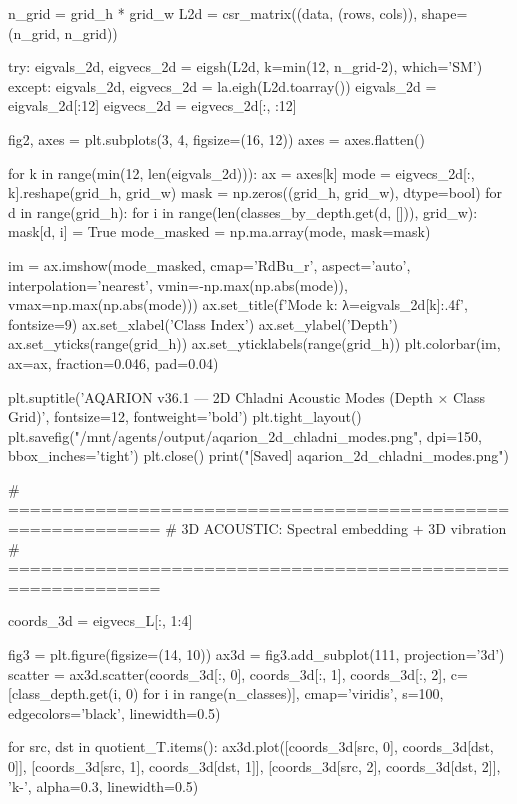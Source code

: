 {{{{{{{{{{{{{n_grid = grid_h * grid_w
L2d = csr_matrix((data, (rows, cols)), shape=(n_grid, n_grid))

try:
    eigvals_2d, eigvecs_2d = eigsh(L2d, k=min(12, n_grid-2), which='SM')
except:
    eigvals_2d, eigvecs_2d = la.eigh(L2d.toarray())
    eigvals_2d = eigvals_2d[:12]
    eigvecs_2d = eigvecs_2d[:, :12]

fig2, axes = plt.subplots(3, 4, figsize=(16, 12))
axes = axes.flatten()

for k in range(min(12, len(eigvals_2d))):
    ax = axes[k]
    mode = eigvecs_2d[:, k].reshape(grid_h, grid_w)
    mask = np.zeros((grid_h, grid_w), dtype=bool)
    for d in range(grid_h):
        for i in range(len(classes_by_depth.get(d, [])), grid_w):
            mask[d, i] = True
    mode_masked = np.ma.array(mode, mask=mask)
    
    im = ax.imshow(mode_masked, cmap='RdBu_r', aspect='auto', 
                   interpolation='nearest', vmin=-np.max(np.abs(mode)), 
                   vmax=np.max(np.abs(mode)))
    ax.set_title(f'Mode {k}: λ={eigvals_2d[k]:.4f}', fontsize=9)
    ax.set_xlabel('Class Index')
    ax.set_ylabel('Depth')
    ax.set_yticks(range(grid_h))
    ax.set_yticklabels(range(grid_h))
    plt.colorbar(im, ax=ax, fraction=0.046, pad=0.04)

plt.suptitle('AQARION v36.1 — 2D Chladni Acoustic Modes (Depth × Class Grid)', 
             fontsize=12, fontweight='bold')
plt.tight_layout()
plt.savefig("/mnt/agents/output/aqarion_2d_chladni_modes.png", dpi=150, bbox_inches='tight')
plt.close()
print("[Saved] aqarion_2d_chladni_modes.png")

# ============================================================
# 3D ACOUSTIC: Spectral embedding + 3D vibration
# ============================================================

coords_3d = eigvecs_L[:, 1:4]

fig3 = plt.figure(figsize=(14, 10))
ax3d = fig3.add_subplot(111, projection='3d')
scatter = ax3d.scatter(coords_3d[:, 0], coords_3d[:, 1], coords_3d[:, 2],
                        c=[class_depth.get(i, 0) for i in range(n_classes)],
                        cmap='viridis', s=100, edgecolors='black', linewidth=0.5)

for src, dst in quotient_T.items():
    ax3d.plot([coords_3d[src, 0], coords_3d[dst, 0]],
              [coords_3d[src, 1], coords_3d[dst, 1]],
              [coords_3d[src, 2], coords_3d[dst, 2]],
              'k-', alpha=0.3, linewidth=0.5)

}}}}}}}}}}}}}
